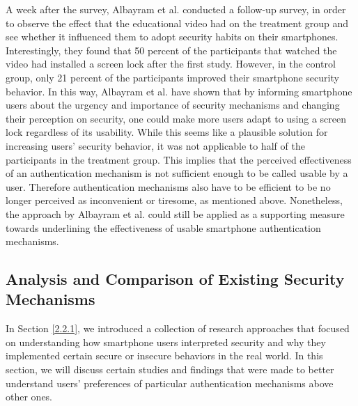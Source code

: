 A week after the survey, Albayram et al. \cite{Albayram:2017:BUL:3235924.3235929} conducted a follow-up survey, in order to observe the effect that the educational video had on the treatment group and see whether it influenced them to adopt security habits on their smartphones.
Interestingly, they found that 50 percent of the participants that watched the video had installed a screen lock after the first study. However, in the control group, only 21 percent of the participants improved their smartphone security behavior. In this way, Albayram et al. \cite{Albayram:2017:BUL:3235924.3235929} have shown that by informing smartphone users about the urgency and importance of security mechanisms and changing their perception on security, one could make more users adapt to using a screen lock regardless of its usability. While this seems like a plausible solution for increasing users' security behavior, it was not applicable to half of the participants in the treatment group. This implies that the perceived effectiveness of an authentication mechanism is not sufficient enough to be called usable by a user. Therefore authentication mechanisms also have to be efficient to be no longer perceived as inconvenient or tiresome, as mentioned above. Nonetheless, the approach by Albayram et al. \cite{Albayram:2017:BUL:3235924.3235929} could still be applied as a supporting measure towards underlining the effectiveness of usable smartphone authentication mechanisms.  


\subsection{Analysis and Comparison of Existing Security Mechanisms} \label{2.2.2}

In Section \ref{2.2.1}, we introduced a collection of research approaches that focused on understanding how smartphone users interpreted security and why they implemented certain secure or insecure behaviors in the real world. In this section, we will discuss certain studies and findings that were made to better understand users' preferences of particular authentication mechanisms above other ones.





